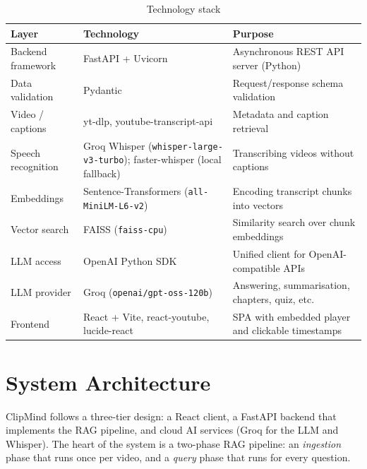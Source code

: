 \documentclass[11pt,a4paper]{article}
\newcommand{\code}[1]{\texttt{#1}}
\begin{document}
\begin{table}[h]
\centering
\renewcommand{\arraystretch}{1.25}
\begin{tabularx}{\textwidth}{@{}l l X@{}}
\toprule
\textbf{Layer} & \textbf{Technology} & \textbf{Purpose} \\
\midrule
Backend framework   & FastAPI + Uvicorn & Asynchronous REST API server (Python) \\
Data validation     & Pydantic          & Request/response schema validation \\
Video / captions    & yt-dlp, youtube-transcript-api & Metadata and caption retrieval \\
Speech recognition  & Groq Whisper (\code{whisper-large-v3-turbo}); faster-whisper (local fallback) & Transcribing videos without captions \\
Embeddings          & Sentence-Transformers (\code{all-MiniLM-L6-v2}) & Encoding transcript chunks into vectors \\
Vector search       & FAISS (\code{faiss-cpu}) & Similarity search over chunk embeddings \\
LLM access          & OpenAI Python SDK & Unified client for OpenAI-compatible APIs \\
LLM provider        & Groq (\code{openai/gpt-oss-120b}) & Answering, summarisation, chapters, quiz, etc. \\
Frontend            & React + Vite, react-youtube, lucide-react & SPA with embedded player and clickable timestamps \\
\bottomrule
\end{tabularx}
\caption{Technology stack}
\end{table}

\section{System Architecture}

ClipMind follows a three-tier design: a React client, a FastAPI backend that implements
the RAG pipeline, and cloud AI services (Groq for the LLM and Whisper). The heart of the
system is a two-phase RAG pipeline: an \emph{ingestion} phase that runs once per video,
and a \emph{query} phase that runs for every question.
\end{document}
